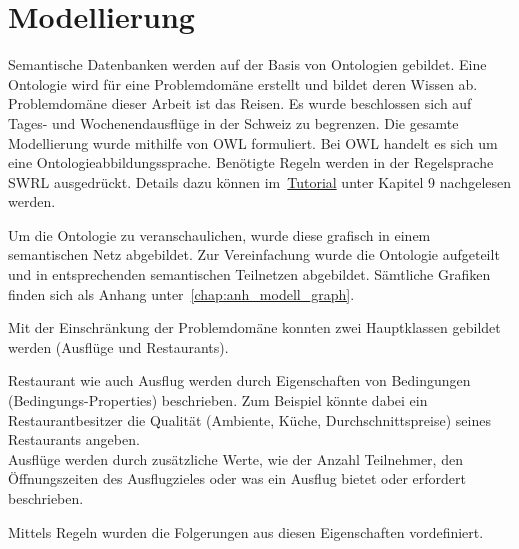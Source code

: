 \section{Modellierung}
\label{sec:loesung_modellierung}
Semantische Datenbanken werden auf der Basis von Ontologien gebildet. Eine Ontologie wird für eine Problemdomäne erstellt und bildet deren Wissen ab. Problemdomäne dieser Arbeit ist das Reisen. Es wurde beschlossen sich auf Tages- und Wochenendausflüge in der Schweiz zu begrenzen. Die gesamte Modellierung wurde mithilfe von OWL formuliert. Bei OWL handelt es sich um eine Ontologieabbildungssprache. Benötigte Regeln werden in der Regelsprache SWRL ausgedrückt. Details dazu können im~\hyperref[sec:anhang:tutorial_dokument]{Tutorial} unter Kapitel 9 nachgelesen werden.

Um die Ontologie zu veranschaulichen, wurde diese grafisch in einem semantischen Netz abgebildet. Zur Vereinfachung wurde die Ontologie aufgeteilt und in entsprechenden semantischen Teilnetzen abgebildet. Sämtliche Grafiken finden sich als Anhang unter~\ref{chap:anh_modell_graph}.

Mit der Einschränkung der Problemdomäne konnten zwei Hauptklassen gebildet werden (Ausflüge und Restaurants).

Restaurant wie auch Ausflug werden durch Eigenschaften von Bedingungen (Bedingungs-Properties) beschrieben. Zum Beispiel könnte dabei ein Restaurantbesitzer die Qualität (Ambiente, Küche, Durchschnittspreise) seines Restaurants angeben.\\
Ausflüge werden durch zusätzliche Werte, wie der Anzahl Teilnehmer, den Öffnungszeiten des Ausflugzieles oder was ein Ausflug bietet oder erfordert beschrieben.

Mittels Regeln wurden die Folgerungen aus diesen Eigenschaften vordefiniert.


